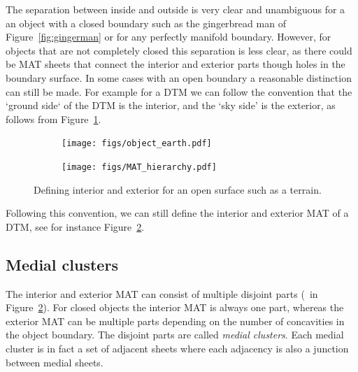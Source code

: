 The separation between inside and outside is very clear and unambiguous for a an object with a closed boundary such as the gingerbread man of Figure~\ref{fig:gingerman} or for any perfectly manifold boundary.
However, for objects that are not completely closed this separation is less clear, as there could be MAT sheets that connect the interior and exterior parts though holes in the boundary surface.
In some cases with an open boundary a reasonable distinction can still be made.
For example for a DTM we can follow the convention that the `ground side` of the DTM is the interior, and the `sky side' is the exterior, as follows from Figure~\ref{fig:object_earth}.
\begin{figure}
	\centering
	\begin{subfigure}{0.4\linewidth}
		\texttt{[image: figs/object\_earth.pdf]}
	\label{fig:object_earth}
	\end{subfigure}
	\quad
	\begin{subfigure}{0.57\linewidth}
		\texttt{[image: figs/MAT\_hierarchy.pdf]}
		\label{fig:matterrain}
	\end{subfigure}
	\caption{Defining interior and exterior for an open surface such as a terrain.}
	\label{fig:intext}
\end{figure}
Following this convention, we can still define the interior and exterior MAT of a DTM, see for instance Figure~\ref{fig:matterrain}.

\subsection{Medial clusters}
The interior and exterior MAT can consist of multiple disjoint parts (\eg\ in Figure~\ref{fig:matterrain}).
For closed objects the interior MAT is always one part, whereas the exterior MAT can be multiple parts depending on the number of concavities in the object boundary.
The disjoint parts are called \emph{medial clusters}.
Each medial cluster is in fact a set of adjacent sheets where each adjacency is also a junction between medial sheets.

